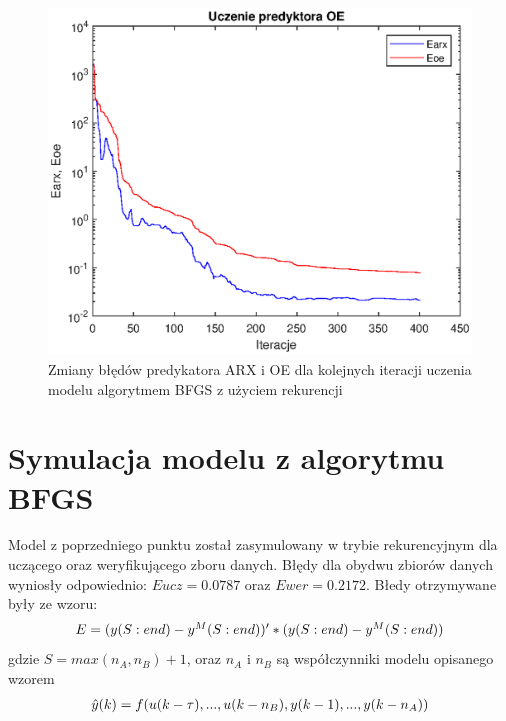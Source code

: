 		\begin{figure}[h!]
			\centering
			\includegraphics[width=\linewidth]{img/BFGS_OE_p.eps}
			\caption{Zmiany błędów predykatora ARX i OE dla kolejnych iteracji uczenia modelu algorytmem BFGS z użyciem rekurencji}
			\label{fig:bfgs_oe_p}
		\end{figure}
		
		\newpage
	\section{Symulacja modelu z algorytmu BFGS}
		\label{sec:bfgs_sym}
		Model z poprzedniego punktu został zasymulowany w trybie rekurencyjnym dla uczącego oraz weryfikującego zboru danych. Błędy dla obydwu zbiorów danych wyniosły odpowiednio: $Eucz = 0.0787$ oraz $Ewer = 0.2172$. Błedy otrzymywane były ze wzoru:
		\begin{equation}
		\begin{tabular}{l}
		$E = (y(S:end)-y^M(S:end))'*(y(S:end)-y^M(S:end))$
		\end{tabular}
		\label{eq:error}
		\end{equation}
		gdzie $S = max(n_A,n_B)+1$, oraz $n_A$ i $n_B$ są współczynniki modelu opisanego wzorem
		\begin{equation}
		\begin{tabular}{l}
		$\hat{y}(k)=f(u(k-\tau),...,u(k-n_B),y(k-1),...,y(k-n_A))$
		\end{tabular}
		\label{eq:model_wzor}
		\end{equation}
		
